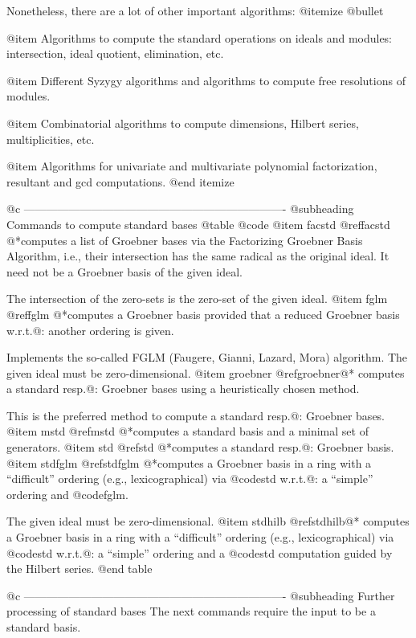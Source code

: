 Nonetheless, there are a lot of other important algorithms:
@itemize @bullet

@item
Algorithms to compute the standard operations on ideals and modules:
intersection, ideal quotient, elimination, etc.

@item
Different Syzygy algorithms and algorithms to compute free resolutions
of modules.

@item
Combinatorial algorithms to compute dimensions, Hilbert series,
multiplicities, etc.

@item
Algorithms for univariate and multivariate polynomial factorization,
resultant and gcd computations.
@end itemize

@c ----------------------------------------------------------------------
@subheading Commands to compute standard bases
@table @code
@item facstd
@ref{facstd}
@*computes a list of Groebner bases via the Factorizing Groebner Basis
Algorithm, i.e., their intersection has the same radical as the original ideal. It need not
be a Groebner basis of the given ideal.

The intersection of the zero-sets is the zero-set of the given ideal.
@item fglm
@ref{fglm}
@*computes a Groebner basis provided that a reduced Groebner basis
w.r.t.@: another ordering is given.

Implements the so-called FGLM (Faugere, Gianni, Lazard, Mora) algorithm.
The given ideal must be zero-dimensional.
@item groebner
@ref{groebner}@*
computes a standard resp.@: Groebner bases using a heuristically chosen
method.

This is the preferred method to compute a standard resp.@: Groebner
bases.
@item mstd
@ref{mstd}
@*computes a standard basis and a minimal set of generators.
@item std
@ref{std}
@*computes a standard resp.@: Groebner basis.
@item stdfglm
@ref{stdfglm}
@*computes a Groebner basis in a ring with a ``difficult'' ordering
(e.g., lexicographical) via @code{std} w.r.t.@: a ``simple'' ordering and
@code{fglm}.

The given ideal must be zero-dimensional.
@item stdhilb
@ref{stdhilb}@*
computes a Groebner basis in a ring with a ``difficult'' ordering
(e.g., lexicographical) via @code{std} w.r.t.@: a ``simple'' ordering
and a @code{std} computation guided by the Hilbert series.
@end table

@c ----------------------------------------------------------------------
@subheading Further processing of standard bases
The next commands require the input to be a standard basis.

